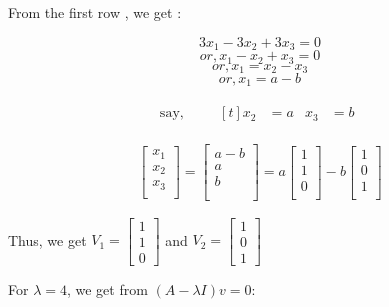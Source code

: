 \documentclass{article}
\begin{document}
From the first row , we get : 

\[ 3x_1 - 3x_2 + 3x_3 = 0 \]
\[or, x_1 - x_2 + x_3 = 0 \]
\[or, x_1 = x_2 - x_3 \]
\[or, x_1 = a - b \] 

\begin{align*}
    \text{say, } \quad & \begin{aligned}[t]
        x_2 &= a &
        x_3 &= b
    \end{aligned}
\end{align*}

\begin{align*}
    \begin{bmatrix}
        x_1 \\
        x_2 \\
        x_3 \\
    \end{bmatrix}
    = \begin{bmatrix}
        a-b \\
        a\\
        b\\\\
    \end{bmatrix}
    = a\begin{bmatrix}
        1 \\
        1\\
        0\\
    \end{bmatrix}
    - b\begin{bmatrix}
        1 \\
        0\\
        1\\
    \end{bmatrix}
\end{align*}

Thus, we get $V_1 = 
\begin{bmatrix}
    1\\
    1\\
    0
\end{bmatrix}$
and $V_2 = \begin{bmatrix}
    1\\ 
    0\\ 
    1
\end{bmatrix}$

\newpage
For $\lambda = 4$, we get from $(A-\lambda I)v = 0$:
\end{document}
